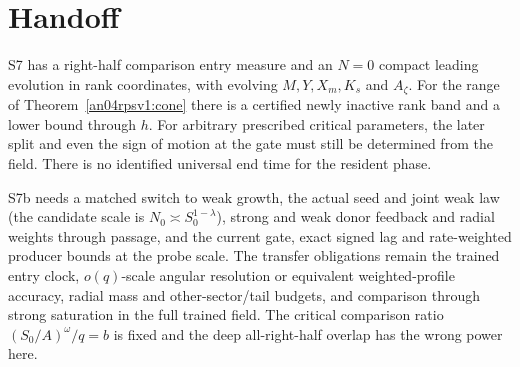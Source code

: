 \documentclass[11pt]{article}
\begin{document}
\section{Handoff}\label{an04rpsv1:handoff}
S7 has a right-half comparison entry measure and an \(N=0\) compact
leading evolution in rank coordinates, with evolving \(M,Y,X_m,K_s\)
and \(A_\zeta\). For the range of Theorem~\ref{an04rpsv1:cone} there
is a certified newly inactive rank band and a lower bound through \(h\).
For arbitrary prescribed critical parameters, the later split and even
the sign of motion at the gate must still be determined from the field.
There is no identified universal end time for the resident phase.

S7b needs a matched switch to weak growth, the actual seed and joint
weak law (the candidate scale is \(N_0\asymp S_0^{1-\lambda}\)),
strong and weak donor feedback and radial weights through passage,
and the current gate, exact signed lag and rate-weighted producer
bounds at the probe scale. The transfer obligations remain the
trained entry clock, \(o(q)\)-scale angular resolution or equivalent
weighted-profile accuracy, radial mass and other-sector/tail budgets,
and comparison through strong saturation in the full trained field.
The critical comparison ratio \((S_0/A)^\omega/q=b\) is fixed and
the deep all-right-half overlap has the wrong power here.
\end{document}
